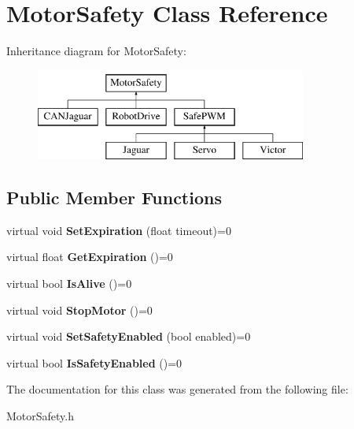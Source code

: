 \hypertarget{classMotorSafety}{\section{\-Motor\-Safety \-Class \-Reference}
\label{classMotorSafety}
}
\-Inheritance diagram for \-Motor\-Safety\-:\begin{figure}[H]
\begin{center}
\leavevmode
\includegraphics[height=3.000000cm]{classMotorSafety}
\end{center}
\end{figure}
\subsection*{\-Public \-Member \-Functions}
\begin{DoxyCompactItemize}
\item 
\hypertarget{classMotorSafety_a63f5e664f03d4f2c2501a5c191c326bc}{virtual void {\bfseries \-Set\-Expiration} (float timeout)=0}\label{classMotorSafety_a63f5e664f03d4f2c2501a5c191c326bc}

\item 
\hypertarget{classMotorSafety_a20bd2a8265b40cbf9311f139265a4c07}{virtual float {\bfseries \-Get\-Expiration} ()=0}\label{classMotorSafety_a20bd2a8265b40cbf9311f139265a4c07}

\item 
\hypertarget{classMotorSafety_a4a4ffeb12291f582e1166d05c0bfbe7c}{virtual bool {\bfseries \-Is\-Alive} ()=0}\label{classMotorSafety_a4a4ffeb12291f582e1166d05c0bfbe7c}

\item 
\hypertarget{classMotorSafety_a4efa2234874ade30cc093118b96b42e1}{virtual void {\bfseries \-Stop\-Motor} ()=0}\label{classMotorSafety_a4efa2234874ade30cc093118b96b42e1}

\item 
\hypertarget{classMotorSafety_addc7856cb3e0c51385efc81d5e659ada}{virtual void {\bfseries \-Set\-Safety\-Enabled} (bool enabled)=0}\label{classMotorSafety_addc7856cb3e0c51385efc81d5e659ada}

\item 
\hypertarget{classMotorSafety_ac228a47e2638afb7e65de916195b180d}{virtual bool {\bfseries \-Is\-Safety\-Enabled} ()=0}\label{classMotorSafety_ac228a47e2638afb7e65de916195b180d}

\end{DoxyCompactItemize}


\-The documentation for this class was generated from the following file\-:\begin{DoxyCompactItemize}
\item 
\-Motor\-Safety.\-h\end{DoxyCompactItemize}
